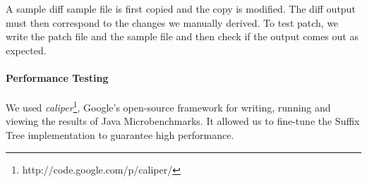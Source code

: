 A sample diff sample file is first copied and the copy is modified. The diff output must then correspond to the changes we manually derived. To test patch, we write the patch file and the sample file and then check if the output comes out as expected.

\paragraph{Performance Testing}
We used \textit{caliper}\footnote{http://code.google.com/p/caliper/}, Google's open-source framework for writing, running and viewing the results of Java Microbenchmarks. It allowed us to fine-tune the Suffix Tree implementation to guarantee high performance.
